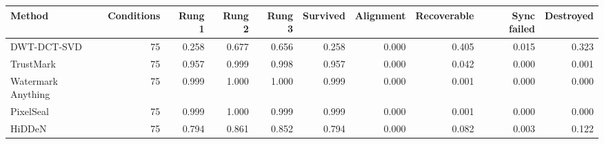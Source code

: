 \begin{tabular}{lrrrrrrrrr}
\toprule
Method & Conditions & Rung 1 & Rung 2 & Rung 3 & Survived & Alignment & Recoverable & Sync failed & Destroyed \\
\midrule
DWT-DCT-SVD & 75 & 0.258 & 0.677 & 0.656 & 0.258 & 0.000 & 0.405 & 0.015 & 0.323 \\
TrustMark & 75 & 0.957 & 0.999 & 0.998 & 0.957 & 0.000 & 0.042 & 0.000 & 0.001 \\
Watermark Anything & 75 & 0.999 & 1.000 & 1.000 & 0.999 & 0.000 & 0.001 & 0.000 & 0.000 \\
PixelSeal & 75 & 0.999 & 1.000 & 0.999 & 0.999 & 0.000 & 0.001 & 0.000 & 0.000 \\
HiDDeN & 75 & 0.794 & 0.861 & 0.852 & 0.794 & 0.000 & 0.082 & 0.003 & 0.122 \\
\bottomrule
\end{tabular}
